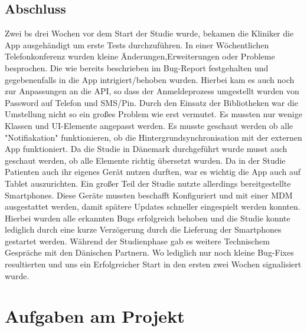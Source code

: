 \subsection{Abschluss}
Zwei bs drei Wochen vor dem Start der Studie wurde, bekamen die Kliniker die App ausgehändigt um erste Tests durchzuführen. In einer Wöchentlichen Telefonkonferenz wurden kleine Änderungen,Erweiterungen oder  Probleme besprochen. Die wie bereits beschrieben im Bug-Report festgehalten  und gegebenenfalls in die App intrigiert/behoben wurden. Hierbei kam es auch noch zur Anpassungen an die API, so dass der Anmeldeprozess umgestellt wurden von Password auf Telefon und SMS/Pin. Durch den Einsatz der Bibliotheken war die Umstellung nicht so ein großes Problem wie erst vermutet. Es mussten nur wenige Klassen und UI-Elemente angepasst werden. Es musste geschaut werden ob alle "Notifiakation" funktionieren, ob die Hintergrundsynchronisation mit der externen App funktioniert. Da die Studie in Dänemark durchgeführt wurde musst auch geschaut werden, ob alle Elemente richtig übersetzt wurden. Da in der Studie Patienten auch ihr eigenes Gerät nutzen durften, war es wichtig die App auch auf Tablet auszurichten. Ein großer Teil der Studie nutzte allerdings bereitgestellte Smartphones. Diese Geräte mussten beschafft Konfiguriert und mit einer MDM%
ausgestattet werden, damit spätere Updates schneller eingespielt werden konnten. Hierbei wurden alle erkannten Bugs erfolgreich behoben und die Studie konnte lediglich durch eine kurze Verzögerung durch die Lieferung der Smartphones gestartet werden. Während der Studienphase gab es weitere Technischem Gespräche mit den Dänischen Partnern. Wo lediglich nur noch kleine Bug-Fixes resultierten und uns ein Erfolgreicher Start in den ersten zwei Wochen signalisiert wurde. 

\section{Aufgaben am Projekt}







